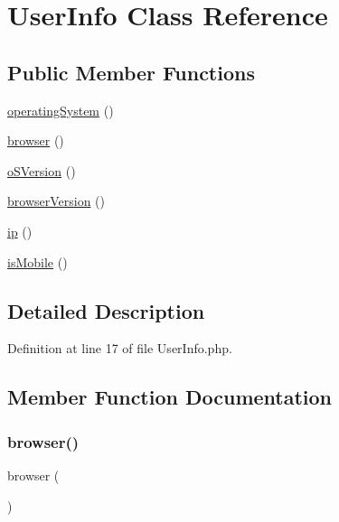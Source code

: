 \hypertarget{class_zest_1_1_user_info_1_1_user_info}{}\section{User\+Info Class Reference}
\label{class_zest_1_1_user_info_1_1_user_info}
\subsection*{Public Member Functions}
\begin{DoxyCompactItemize}
\item 
\mbox{\hyperlink{class_zest_1_1_user_info_1_1_user_info_aeba63cc8a47f81d0bf55be43b83b3ea8}{operating\+System}} ()
\item 
\mbox{\hyperlink{class_zest_1_1_user_info_1_1_user_info_a7dbfb19bfe0682921dcfad5de8dc987c}{browser}} ()
\item 
\mbox{\hyperlink{class_zest_1_1_user_info_1_1_user_info_ac9247d3d47b420d84e7b8fdb0f074378}{o\+S\+Version}} ()
\item 
\mbox{\hyperlink{class_zest_1_1_user_info_1_1_user_info_aa6929365709e494ccd542cfd04d384e4}{browser\+Version}} ()
\item 
\mbox{\hyperlink{class_zest_1_1_user_info_1_1_user_info_a197bae3714812901860bd006b00f91de}{ip}} ()
\item 
\mbox{\hyperlink{class_zest_1_1_user_info_1_1_user_info_aa03affe506ea70c6d04fab89fee473fc}{is\+Mobile}} ()
\end{DoxyCompactItemize}


\subsection{Detailed Description}


Definition at line 17 of file User\+Info.\+php.



\subsection{Member Function Documentation}
\mbox{\label{class_zest_1_1_user_info_1_1_user_info_a7dbfb19bfe0682921dcfad5de8dc987c}} 
\subsubsection{\texorpdfstring{browser()}{browser()}}
{\footnotesize\ttfamily browser (\begin{DoxyParamCaption}{ }\end{DoxyParamCaption})}

